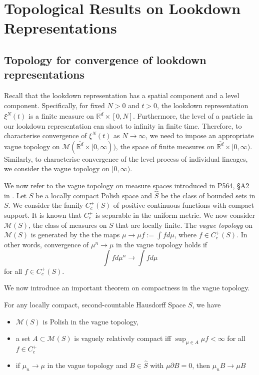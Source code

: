 

\section{Topological Results on Lookdown Representations}
\label{sec: Topologies on Lookdown}
\subsection{Topology for convergence of lookdown representations}

Recall that
the lookdown representation has a spatial component and a level component.
Specifically, for fixed $N>0$ and $t>0$,
the lookdown representation $\xi^N(t)$ 
is a finite measure on $\overline{\mathbb{R}^d} \times [0,N]$.
Furthermore, the level of a particle in our lookdown representation can shoot to infinity in finite time.
Therefore, to characterise convergence of $\xi^N(t)$ as $N \to \infty$,
we need to impose an appropriate vague topology on $\mathcal{M}(\overline{\mathbb{R}^d} \times [0,\infty))$,
the space of finite measures on $\overline{\mathbb{R}^d} \times [0,\infty)$.
Similarly, to characterise convergence of the level process of individual lineages, we consider the vague topology on $[0,\infty)$.



We now refer to the vague topology on measure spaces introduced in P564, \S A2 in \cite{kallenberg1997foundations}.
Let $S$ be a locally compact Polish space and $\hat{S}$ be the class of bounded sets in $S$.
We consider the family $C^{+}_c(S)$ of positive continuous functions with compact support. It is known that $C^{+}_c$ is separable in the uniform metric.
We now consider $\mathcal{M}(S)$, the class of measures on $S$ that are locally finite.
The \textit{vague topology} on $\mathcal{M}(S)$ is generated by the the maps $\mu \to \mu f := \int f d \mu$, where $f\in C^{+}_{c}(S)$.
In other words, convergence of $\mu^n \to \mu$ in the vague topology holds if 
$$\int f d\mu^n \to \int f d\mu$$
for all $f\in C^{+}_{c}(S)$.

We now introduce an important theorem on compactness in the vague topology.
\begin{theorem}
For any locally compact, second-countable Hausdorff Space $S$, 
we have
\begin{itemize}
\item $\mathcal{M}(S)$ is Polish in the vague topology,
\item a set $A\subset \mathcal{M}(S)$ is vaguely relatively compact iff $\sup_{\mu\in A} \mu f < \infty$ for all $f \in C^{+}_{c}$
\item if $\mu_n \to \mu$ in the vague topology and $B \in \hat{S}$ with $\mu \partial B = 0$, then $\mu_n B \to \mu B$
\end{itemize}
\end{theorem}

